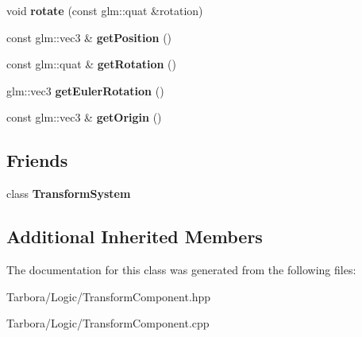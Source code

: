 \begin{DoxyCompactItemize}
\item 
\mbox{\label{classTarbora_1_1TransformComponent_aae022c45af98f996d64f75c2361c30ca}} 
void {\bfseries rotate} (const glm\+::quat \&rotation)
\item 
\mbox{\label{classTarbora_1_1TransformComponent_a8a04684f317fe2c84503445516ac0720}} 
const glm\+::vec3 \& {\bfseries get\+Position} ()
\item 
\mbox{\label{classTarbora_1_1TransformComponent_ad4ff0d85f79e6339e2cae5c0577b59b4}} 
const glm\+::quat \& {\bfseries get\+Rotation} ()
\item 
\mbox{\label{classTarbora_1_1TransformComponent_a7b280e2a6f5386f6971f6537a61fda01}} 
glm\+::vec3 {\bfseries get\+Euler\+Rotation} ()
\item 
\mbox{\label{classTarbora_1_1TransformComponent_a65839e62d680fa9544afe6323bdef5da}} 
const glm\+::vec3 \& {\bfseries get\+Origin} ()
\end{DoxyCompactItemize}
\subsection*{Friends}
\begin{DoxyCompactItemize}
\item 
\mbox{\label{classTarbora_1_1TransformComponent_a318469cfd809ba3993eb0331cba48707}} 
class {\bfseries Transform\+System}
\end{DoxyCompactItemize}
\subsection*{Additional Inherited Members}


The documentation for this class was generated from the following files\+:\begin{DoxyCompactItemize}
\item 
Tarbora/\+Logic/Transform\+Component.\+hpp\item 
Tarbora/\+Logic/Transform\+Component.\+cpp\end{DoxyCompactItemize}
